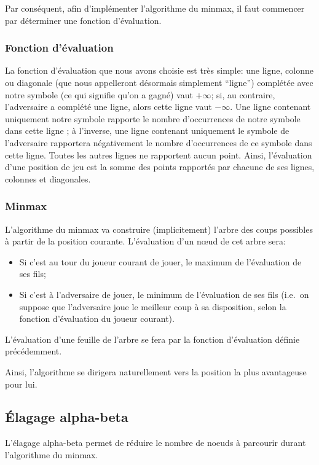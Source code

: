 Par conséquent, afin d'implémenter l'algorithme du minmax, il faut
commencer par déterminer une fonction d'évaluation.

\subsubsection{Fonction d'évaluation}
La fonction d'évaluation que nous avons choisie est très simple: une
ligne, colonne ou diagonale (que nous appelleront désormais simplement
``ligne'') complétée avec notre symbole (ce qui signifie qu'on a
gagné) vaut $+\infty$; si, au contraire, l'adversaire a complété une
ligne, alors cette ligne vaut $-\infty$. Une ligne contenant
uniquement notre symbole rapporte le nombre d'occurrences de notre
symbole dans cette ligne ; à l'inverse, une ligne contenant uniquement
le symbole de l'adversaire rapportera négativement le nombre
d'occurrences de ce symbole dans cette ligne.
Toutes les autres lignes ne rapportent aucun point.
Ainsi, l'évaluation d'une position de jeu est la somme des points
rapportés par chacune de ses lignes, colonnes et diagonales.

\subsubsection{Minmax}
L'algorithme du minmax va construire (implicitement) l'arbre des coups
possibles à partir de la position courante.
L'évaluation d'un nœud de cet arbre sera:
\begin{itemize}
  \item Si c'est au tour du joueur courant de jouer, le maximum de
    l'évaluation de ses fils;
  \item Si c'est à l'adversaire de jouer, le minimum de l'évaluation
    de ses fils (i.e.\ on suppose que l'adversaire joue le meilleur
    coup à sa disposition, selon la fonction d'évaluation du joueur courant).
\end{itemize}

L'évaluation d'une feuille de l'arbre se fera par la fonction
d'évaluation définie précédemment.

Ainsi, l'algorithme se dirigera naturellement vers la position la plus
avantageuse pour lui.

\subsection{Élagage alpha-beta}
L'élagage alpha-beta permet de réduire le nombre de noeuds à parcourir durant
l'algorithme du minmax.

